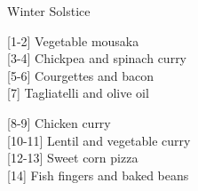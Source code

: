 		\begin{menu}{Winter Solstice}
    
    \begin{recipelist}
    
        {\scriptsize[1-2]} Vegetable mousaka\\
        {\scriptsize[3-4]} Chickpea and spinach curry\\
        {\scriptsize[5-6]} Courgettes and bacon\\
        {\scriptsize[7]} Tagliatelli and olive oil\\%
    \end{recipelist}%
    \begin{recipelist}
    
        {\scriptsize[8-9]} Chicken curry\\
        {\scriptsize[10-11]} Lentil and vegetable curry\\
        {\scriptsize[12-13]} Sweet corn pizza\\
        {\scriptsize[14]} Fish fingers and baked beans\\%
    \end{recipelist}\par%
  

\end{menu}
